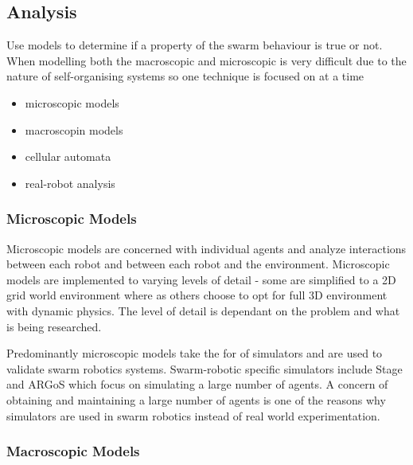 \subsection{Analysis}

Use models to determine if a property of the swarm behaviour is true or not. When modelling both the macroscopic and microscopic is very difficult due to the nature of self-organising systems so one technique is focused on at a time \cite{abbott2006emergence}


\begin{itemize}
	\item microscopic models
	\item macroscopin models
	\item cellular automata
	\item real-robot analysis
\end{itemize}

\subsubsection{Microscopic Models}
\label{microscopicmodels}

Microscopic models are concerned with individual agents and analyze interactions between each robot and between each robot and the environment. Microscopic models are implemented to varying levels of detail - some are simplified to a 2D grid world environment where as others choose to opt for full 3D environment with dynamic physics. The level of detail is dependant on the problem and what is being researched.

Predominantly microscopic models take the for of simulators and are used to validate swarm robotics systems. Swarm-robotic specific simulators include Stage \cite{vaughan2008massively} and ARGoS \cite{pinciroli2011argos} which focus on simulating a large number of agents. A concern of obtaining and maintaining a large number of agents is one of the reasons why simulators are used in swarm robotics instead of real world experimentation.

\subsubsection{Macroscopic Models}
\label{macroscopicmodels}

